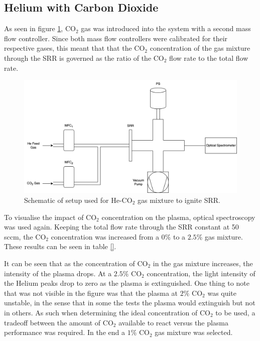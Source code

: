\subsection{Helium with Carbon Dioxide}
\label{subsec:helium_and_co2}

As seen in figure \ref{fig:co2_testing_setup}, CO$_2$ gas was introduced into the system with a second mass flow controller. Since both mass flow controllers were calibrated for their respective gases, this meant that that the CO$_2$ concentration of the gas mixture through the SRR is governed as the ratio of the CO$_2$ flow rate to the total flow rate. 

\begin{figure}[h!]
	\centering
	\includegraphics[width=0.8\linewidth]{chapter_4/figures/co2_testing_setup.png}
	\caption{Schematic of setup used for He-CO$_2$ gas mixture to ignite SRR.}
	\label{fig:co2_testing_setup}
\end{figure}

To visualise the impact of CO$_2$ concentration on the plasma, optical spectroscopy was used again. Keeping the total flow rate through the SRR constant at 50 sccm, the CO$_2$ concentration was increased from a $0\%$ to a $2.5\%$ gas mixture. These results can be seen in table \ref{}. 

It can be seen that as the concentration of CO$_2$ in the gas mixture increases, the intensity of the plasma drops. At a $2.5\%$ CO$_2$ concentration, the light intensity of the Helium peaks drop to zero as the plasma is extinguished. One thing to note that was not visible in the figure was that the plasma at $2\%$ CO$_2$ was quite unstable, in the sense that in some the tests the plasma would extinguish but not in others. As such when determining the ideal concentration of CO$_2$ to be used, a tradeoff between the amount of CO$_2$  available to react versus the plasma performance was required. In the end a $1\%$ CO$_2$ gas mixture was selected. 

